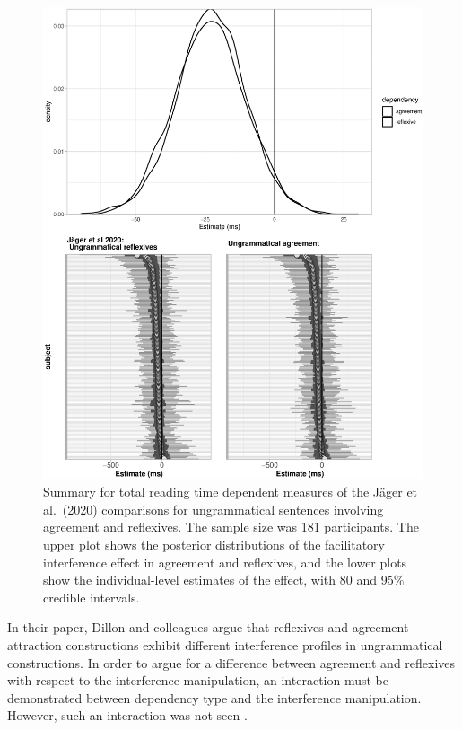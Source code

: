 \documentclass{cambridge7A}\usepackage[]{graphicx}\usepackage[]{color}
\makeatletter
\def\maxwidth{ %
  \ifdim\Gin@nat@width>\linewidth
    \linewidth
  \else
    \Gin@nat@width
  \fi
}
\newenvironment{knitrout}{}{} %
\makeatother
\begin{document}
\begin{figure}[!hbtp]
\centering
\begin{knitrout}
\color{fgcolor}

{\centering \includegraphics[width=\maxwidth]{figures/fig-unnamed-chunk-2-1} 

}



\end{knitrout}
\caption{Summary for total reading time dependent measures of the J{\"a}ger et al.\ (2020) comparisons for ungrammatical sentences involving agreement and reflexives. The sample size was 181 participants. The upper plot shows the posterior distributions of the facilitatory interference effect in agreement and reflexives, and the lower plots show the individual-level estimates of the effect, with 80 and 95\% credible intervals.}\label{fig:dillonrepresults}
\end{figure}

In their paper, Dillon and colleagues argue that reflexives and agreement attraction constructions exhibit different interference profiles in ungrammatical constructions. In order to argue for a difference between agreement and reflexives with respect to the interference manipulation, an interaction must be demonstrated between dependency type and the interference manipulation. However, such an interaction was not seen \citep{JaegerMertzenVanDykeVasishth2019}.  
\end{document}

